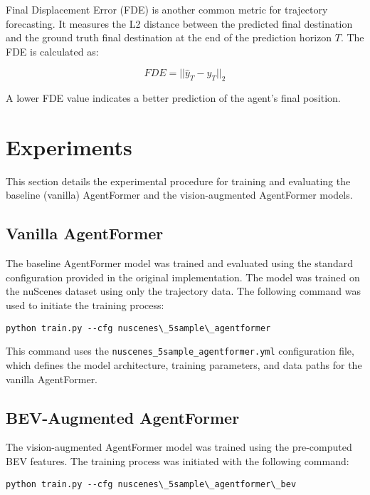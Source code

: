 Final Displacement Error (FDE) is another common metric for trajectory forecasting. It measures the L2 distance between the predicted final destination and the ground truth final destination at the end of the prediction horizon $T$. The FDE is calculated as:

\begin{equation}
FDE = ||\hat{y}_T - y_T||_2
\end{equation}

A lower FDE value indicates a better prediction of the agent's final position.

\section{Experiments}

This section details the experimental procedure for training and evaluating the baseline (vanilla) AgentFormer and the vision-augmented AgentFormer models.

\subsection{Vanilla AgentFormer}

The baseline AgentFormer model was trained and evaluated using the standard configuration provided in the original implementation. The model was trained on the nuScenes dataset using only the trajectory data. The following command was used to initiate the training process:

\begin{verbatim}
python train.py --cfg nuscenes\_5sample\_agentformer
\end{verbatim}

This command uses the \texttt{nuscenes\_5sample\_agentformer.yml} configuration file, which defines the model architecture, training parameters, and data paths for the vanilla AgentFormer.

\subsection{BEV-Augmented AgentFormer}

The vision-augmented AgentFormer model was trained using the pre-computed BEV features. The training process was initiated with the following command:

\begin{verbatim}
python train.py --cfg nuscenes\_5sample\_agentformer\_bev
\end{verbatim}

